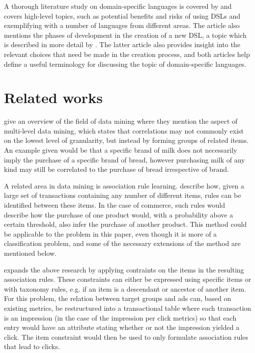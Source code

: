 \documentclass[a4paper]{article}
\begin{document}
A thorough literature study on domain-specific languages is covered by \citet{Deursen2000} and covers high-level topics, such as
potential benefits and risks of using DSLs and exemplifying with a number of languages from different areas. The article also
mentions the phases of development in the creation of a new DSL, a topic which is described in more detail by \citet{Mernik2005}.
The latter article also provides insight into the relevant choices that need be made in the creation process, and both articles
help define a useful terminology for discussing the topic of domain-specific languages.

\section{Related works}
\citet{Chen1996} give an overview of the field of data mining where they mention the aspect of multi-level data mining, which
states that correlations may not commonly exist on the lowest level of granularity, but instead by forming groups of related
items. An example given would be that a specific brand of milk does not necessarily imply the purchase of a specific brand of
bread, however purchasing milk of any kind may still be correlated to the purchase of bread irrespective of brand.

A related area in data mining is association rule learning. \citet{Agrawal1993} describe how, given a large set of
transactions containing any number of different items, rules can be identified between these items. In the case of commerce,
such rules would describe how the purchase of one product would, with a probability above a certain threshold, also infer
the purchase of another product. This method could be applicable to the problem in this paper, even though it is more of a
classification problem, and some of the necessary extensions of the method are mentioned below.

\citet{Srikant1997} expands the above research by applying contraints on the items in the resulting association rules. These
constraints can either be expressed using specific items or with taxonomy rules, e.g. if an item is a descendant or ancestor
of another item. For this problem, the relation between target groups and ads can, based on existing metrics, be restructured into
a transactional table where each transaction is an impression (in the case of the impression per click metrics) so that each entry
would have an attribute stating whether or not the impression yielded a click. The item constraint would then be used to only
formulate association rules that lead to clicks.
\end{document}
